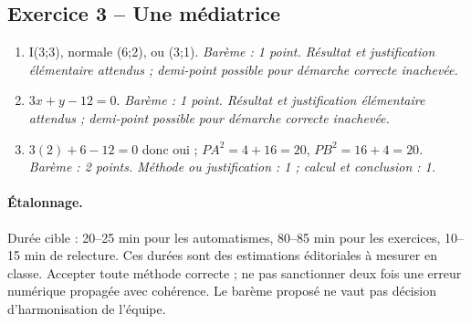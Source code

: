 \subsection*{Exercice 3 -- Une médiatrice}
\begin{enumerate}
\item I(3;3), normale (6;2), ou (3;1). \textit{Barème : 1 point. Résultat et justification élémentaire attendus ; demi-point possible pour démarche correcte inachevée.}
\item $3x+y-12=0$. \textit{Barème : 1 point. Résultat et justification élémentaire attendus ; demi-point possible pour démarche correcte inachevée.}
\item $3(2)+6-12=0$ donc oui ; $PA^2=4+16=20$, $PB^2=16+4=20$. \textit{Barème : 2 points. Méthode ou justification : 1 ; calcul et conclusion : 1.}
\end{enumerate}
\paragraph{Étalonnage.} Durée cible : 20–25 min pour les automatismes, 80–85 min pour les exercices, 10–15 min de relecture. Ces durées sont des estimations éditoriales à mesurer en classe. Accepter toute méthode correcte ; ne pas sanctionner deux fois une erreur numérique propagée avec cohérence. Le barème proposé ne vaut pas décision d’harmonisation de l’équipe.
